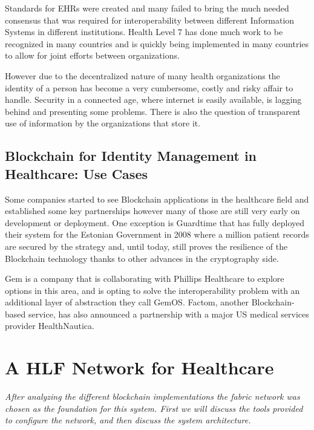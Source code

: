\documentclass[]{llncs}
\begin{document}
Standards for EHRs were created and many failed to bring the much needed 
consensus that was required for interoperability between different 
Information Systems in different institutions. 
Health Level 7 has done much work to be recognized in many countries and 
is quickly being implemented in many countries to allow for joint efforts 
between organizations.

However due to the decentralized nature of many health organizations the 
identity of a person has become a very cumbersome, costly and risky affair to handle. 
Security in a connected age, where internet is easily available, is lagging behind 
and presenting some problems. 
There is also the question of transparent use of information by the organizations 
that store it.
%

\subsection{Blockchain for Identity Management in Healthcare: Use Cases}
Some companies started to see Blockchain applications in the healthcare field 
and established some key partnerships however many of those are still very early 
on development or deployment. 
One exception is Guardtime that has fully deployed 
their system for the Estonian Government in 2008 where a million patient records 
are secured by the strategy and, until today, still proves the resilience of the 
Blockchain technology thanks to other advances in the cryptography side.

Gem is a company that is collaborating with Phillips Healthcare to explore options 
in this area, and is opting to solve the interoperability problem with an additional 
layer of abstraction they call GemOS. 
Factom, another Blockchain-based service, has also announced a partnership with a 
major US medical services provider HealthNautica.\cite{BlockchainCompHealth2017,FactomPartnership2017}



\section{A HLF Network for Healthcare} \label{HLFHealthcare}
\textit{After analyzing the different blockchain implementations the fabric network was 
chosen as the foundation for this system. 
First we will discuss the tools provided to configure the network, and then discuss 
the system architecture.}
\end{document}
